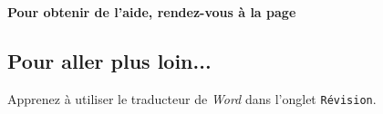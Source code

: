 \begin{center}\label{modelePage5e2}\end{center}

\textbf{Pour obtenir de l'aide, rendez-vous à la page \pageref{aide_seancesWord}}

\subsection{Pour aller plus loin...}

Apprenez à utiliser le traducteur de \emph{Word} dans l'onglet \texttt{Révision}.

















